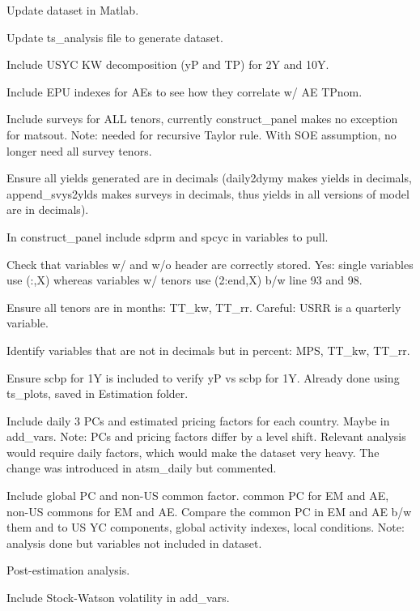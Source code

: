 \documentclass[12pt]{article}
\newcommand{\cmark}{\ding{51}}
\newcommand{\xmark}{\ding{55}}
\newcommand{\done}{\rlap{$\square$}{\raisebox{2pt}{\large\hspace{1pt}\cmark}}%
	\hspace{-2.5pt}}
\newcommand{\wontdo}{\rlap{$\square$}{\large\hspace{1pt}\xmark}}
\begin{document}
\begin{todolist}
	\item[\done] Update dataset in Matlab.
	\begin{todolist}
		\item[\done] Update ts_analysis file to generate dataset.
		\item[\done] Include USYC KW decomposition (yP and TP) for 2Y and 10Y.
		\item[\done] Include EPU indexes for AEs to see how they correlate w/ AE TPnom.
		\item[\wontdo] Include surveys for ALL tenors, currently construct_panel makes no exception for matsout. Note: needed for recursive Taylor rule. With SOE assumption, no longer need all survey tenors.
		\item[\done] Ensure all yields generated are in decimals (daily2dymy makes yields in decimals, append_svys2ylds makes surveys in decimals, thus yields in all versions of model are in decimals).
		\item[\done] In construct_panel include sdprm and spcyc in variables to pull.
		\item[\done] Check that variables w/ and w/o header are correctly stored. Yes: single variables use (:,X) whereas variables w/ tenors use (2:end,X) b/w line 93 and 98.
		\item[\done] Ensure all tenors are in months: TT_kw, TT_rr. Careful: USRR is a quarterly variable.
		\item[\done] Identify variables that are not in decimals but in percent: MPS, TT_kw, TT_rr.
		\item[\wontdo] Ensure scbp for 1Y is included to verify yP vs scbp for 1Y. Already done using ts_plots, saved in Estimation folder.
		\item[\wontdo] Include daily 3 PCs and estimated pricing factors for each country. Maybe in add_vars. Note: PCs and pricing factors differ by a level shift. Relevant analysis would require daily factors, which would make the dataset very heavy. The change was introduced in atsm_daily but commented.
		\item[\done] Include global PC and non-US common factor. common PC for EM and AE, non-US commons for EM and AE. Compare the common PC in EM and AE b/w them and to US YC components, global activity indexes, local conditions. Note: analysis done but variables not included in dataset.
	\end{todolist}
	\item[\done] Post-estimation analysis.
	\begin{todolist}
		\item[\done] Include Stock-Watson volatility in add_vars.

\end{todolist}
\end{todolist}
\end{document}

